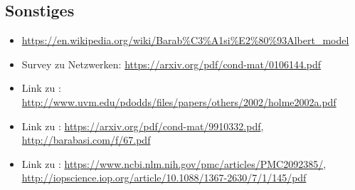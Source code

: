 \documentclass[11pt, a4paper]{scrartcl}
\begin{document}
\subsection{Sonstiges}
\begin{itemize}
\item \url{https://en.wikipedia.org/wiki/Barab%C3%A1si%E2%80%93Albert_model}
\item Survey zu Netzwerken: \url{https://arxiv.org/pdf/cond-mat/0106144.pdf}
\item Link zu \autocite{Holme2002}: \url{http://www.uvm.edu/pdodds/files/papers/others/2002/holme2002a.pdf}
\item Link zu \autocite{Barabasi509}: \url{https://arxiv.org/pdf/cond-mat/9910332.pdf}, \url{http://barabasi.com/f/67.pdf}
\item Link zu \autocite{Ispolatov2005}: \url{https://www.ncbi.nlm.nih.gov/pmc/articles/PMC2092385/}, \url{http://iopscience.iop.org/article/10.1088/1367-2630/7/1/145/pdf}
\end{itemize}
\end{document}
